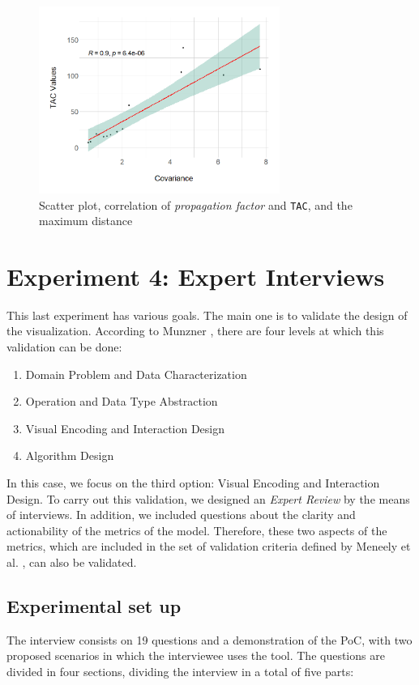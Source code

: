 \begin{figure}[ht!]
\begin{center}
\includegraphics[width=0.7\textwidth]{figures/results/covariance-values-tac.png}
\caption{Scatter plot, correlation of \textit{propagation factor} and \texttt{TAC}, and the maximum distance}
\label{fig:cor-dist-tac}
\end{center}
\end{figure}

\section{Experiment 4: Expert Interviews}
This last experiment has various goals. The main one is to validate the design of the visualization. According to Munzner \cite{Munzner2009}, there are four levels at which this validation can be done:

\begin{enumerate}
  \item Domain Problem and Data Characterization
  \item Operation and Data Type Abstraction
  \item Visual Encoding and Interaction Design
  \item Algorithm Design
\end{enumerate}

In this case, we focus on the third option: Visual Encoding and Interaction Design. To carry out this validation, we designed an \textit{Expert Review} by the means of interviews. In addition, we included questions about the clarity and actionability of the metrics of the model. Therefore, these two aspects of the metrics, which are included in the set of validation criteria defined by Meneely et al. \cite{Meneely2012}, can also be validated.

\subsection{Experimental set up}
The interview consists on 19 questions and a demonstration of the PoC, with two proposed scenarios in which the interviewee uses the tool. The questions are divided in four sections, dividing the interview in a total of five parts:

